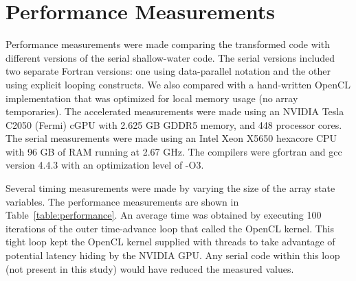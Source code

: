 \section{Performance Measurements}

Performance measurements were made comparing the transformed code with different
versions of the serial shallow-water code.  The serial versions included two
separate Fortran versions: one using data-parallel notation and the other using
explicit looping constructs.  We also compared with a hand-written OpenCL
implementation that was optimized for local memory usage (no array temporaries).
The accelerated measurements were made using an NVIDIA Tesla C2050 (Fermi) cGPU
with 2.625 GB GDDR5 memory, and 448 processor cores.  The serial measurements
were made using an Intel Xeon X5650 hexacore CPU with 96 GB of RAM running at
2.67 GHz.  The compilers were gfortran and gcc version 4.4.3 with an
optimization level of -O3.




Several timing measurements were made by varying the size of the array state
variables.  The performance measurements are shown in Table~\ref{table:performance}.  An average time was obtained by executing 100 iterations of the outer
time-advance loop that called the OpenCL kernel. This tight loop kept the OpenCL
kernel supplied with threads to take advantage of potential latency hiding by
the NVIDIA GPU.  Any serial code within this loop (not present in this study)
would have reduced the measured values.

